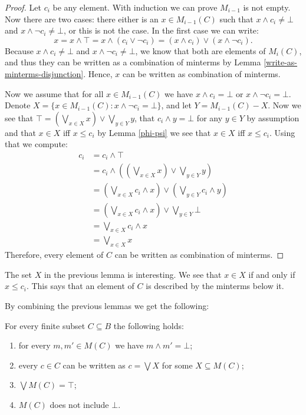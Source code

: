 \begin{proof}
Let $c_i$ be any element. With induction we can prove $M_{i-1}$ is not empty. Now there are two cases: there either is an $x \in M_{i-1}(C)$ such that $x \land c_i \neq \bot$ and $x \land \neg c_i \neq \bot$, or this is not the case. In the first case we can write:
\[x = x \land \top = x \land (c_i \lor \neg c_i) = (x \land c_i) \lor (x \land \neg c_i).\]
Because $x \land c_i \neq \bot$ and $x \land \neg c_i \neq \bot$, we know that both are elements of $M_i(C)$, and thus they can be written as a combination of minterms by Lemma \ref{write-as-minterms-disjunction}. Hence, $x$ can be written as combination of minterms.

Now we assume that for all $x \in M_{i-1}(C)$ we have $x \land c_i = \bot$ or $x \land \neg c_i = \bot$. Denote $X = \{x \in M_{i-1}(C) : x \land \neg c_i = \bot\}$, and let $Y = M_{i-1}(C)-X$. Now we see that $\top = (\bigvee_{x \in X} x) \vee \bigvee_{y \in Y} y$, that $c_i \wedge y = \bot$ for any $y \in Y$ by assumption and that $x \in X$ iff $x \leq c_i$ by Lemma \ref{phi-psi} we see that $x \in X$ iff $x \leq c_i$. Using that we compute:
\begin{equation*}
\begin{split}
c_i &= c_i \land \top\\
&= c_i \land ((\bigvee_{x \in X} x) \vee \bigvee_{y \in Y} y)\\
&= (\bigvee_{x \in X} c_i \land x) \vee (\bigvee_{y \in Y} c_i \land y)\\
&= (\bigvee_{x \in X} c_i \land x) \vee \bigvee_{y \in Y} \bot\\
&= \bigvee_{x \in X} c_i \land x\\
&= \bigvee_{x \in X} x
\end{split}
\end{equation*}
Therefore, every element of $C$ can be written as combination of minterms.
\end{proof}

The set $X$ in the previous lemma is interesting. We see that $x \in X$ if and only if $x \leq c_i$. This says that an element of $C$ is described by the minterms below it.

By combining the previous lemmas we get the following:

\begin{proposition}
\label{minterms-props}
For every finite subset $C\subseteq B$ the following holds:
\begin{enumerate}
\item for every $m,m'\in M(C)$ we have $m\land m' = \bot$;
\item every $c \in C$ can be written as $c = \bigvee X$ for some $X \subseteq M(C)$;
\item $\bigvee M(C) = \top$;
\item $M(C)$ does not include ${\bot}$.
\end{enumerate}
\end{proposition}

